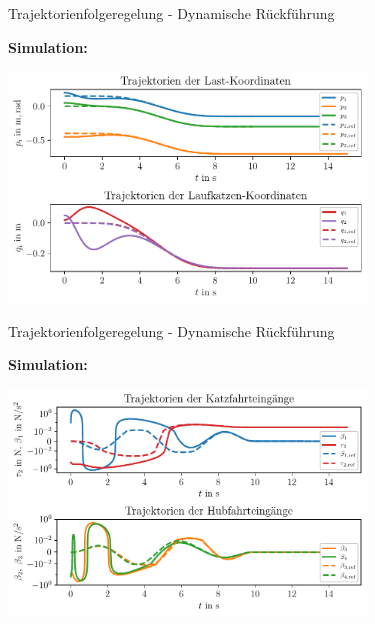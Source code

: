\documentclass[
	ngerman,
	10pt,				%
	aspectratio=169 	%
]{beamer}
\begin{document}

\begin{frame}[t,fragile,label=trajektorienregelung_71]{\large Trajektorienfolgeregelung - Dynamische Rückführung}
	
	\textbf{Simulation:}
	\begin{center}
		\includegraphics[width=95mm]{images/dyn_controller_initial_error_flat_output}
	\end{center}
	
\end{frame}


\begin{frame}[t,fragile,label=trajektorienregelung_72]{\large Trajektorienfolgeregelung - Dynamische Rückführung}
	
	\textbf{Simulation:}
	\begin{center}
		\includegraphics[width=95mm]{images/dyn_controller_initial_error_inputs}
	\end{center}
	
\end{frame}

\end{document}
